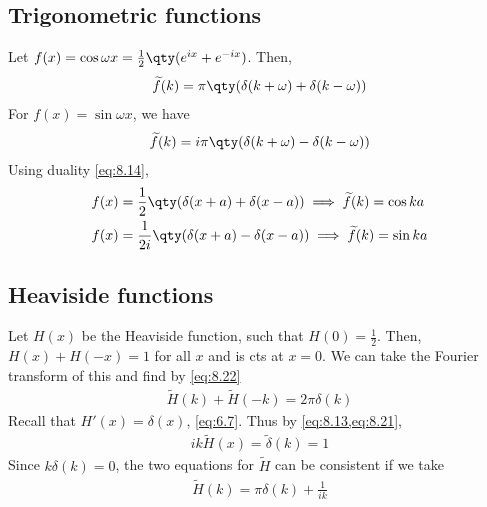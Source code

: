 \subsection{Trigonometric functions}
Let $f(x) = \cos \omega x = \frac{1}{2} \qty(e^{ix} + e^{-ix})$.
Then,
\begin{align} \label{eq:8.24}
	\widetilde f(k) = \pi\qty(\delta(k+\omega) + \delta(k-\omega))
\end{align}
For $f(x) = \sin \omega x$, we have
\begin{align*}
	\widetilde f(k) = i\pi\qty(\delta(k+\omega) - \delta(k-\omega))
\end{align*}
Using duality \cref{eq:8.14},
\begin{align*}
	f(x) & = \frac{1}{2}\qty(\delta(x+a) + \delta(x-a)) \implies \widetilde f(k) = \cos ka  \\
	f(x) & = \frac{1}{2i}\qty(\delta(x+a) - \delta(x-a)) \implies \widetilde f(k) = \sin ka
\end{align*}

\subsection{Heaviside functions}
Let $H(x)$ be the Heaviside function, such that $H(0) = \frac{1}{2}$.
Then, $H(x) + H(-x) = 1$ for all $x$ and is cts at $x = 0$.
We can take the Fourier transform of this and find by \cref{eq:8.22}
\begin{align*}
	\widetilde H(k) + \widetilde H(-k) = 2\pi \delta(k) \tag{$\ast$}
\end{align*}
Recall that $H'(x) = \delta(x)$, \cref{eq:6.7}.
Thus by \cref{eq:8.13,eq:8.21},
\begin{align*}
	ik \widetilde H(x) = \widetilde \delta(k) = 1 \tag{$\dagger$}
\end{align*}
Since $k \delta(k) = 0$, the two equations for $\widetilde H$ can be consistent if we take
\begin{align} \label{eq:8.25}
	\widetilde H(k) = \pi\delta(k) + \frac{1}{ik}
\end{align}

